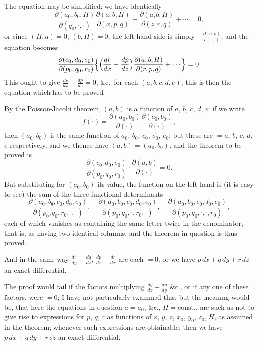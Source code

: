 \documentclass[11pt,a4paper]{article}
\theoremstyle{plain}
\theoremstyle{definition}
\begin{document}
The equation may be simplified; we have identically
\[
\frac{\partial(a_0, b_0, H)}{\partial(q_0, \cdot, \cdot)} \frac{\partial(a, b, H)}{\partial(x, p, q)} + \frac{\partial(a, b, H)}{\partial(z, r, q)} + \cdots = 0,
\]
or since $(H, a) = 0$, $(b, H) = 0$, the left-hand side is simply $-\frac{\partial(a, b)}{\partial(\cdot, \cdot)}$, and the equation becomes
\[
\frac{\partial(c_0, d_0, e_0)}{\partial(p_0, q_0, r_0)} \Bigl\{\Bigl(\frac{dr}{dx} - \frac{dp}{dz}\Bigr) \frac{\partial(a, b, H)}{\partial(r, p, q)} + \cdots\Bigr\} = 0.
\]
This ought to give $\frac{dr}{dx} - \frac{dp}{dz} = 0$, \&c.~for each $(a, b, c, d, e)$; this is then the equation which has to be proved.

By the Poisson-Jacobi theorem, $(a, b)$ is a function of $a$, $b$, $c$, $d$, $e$: if we write
\[
f(\cdot) = \frac{\partial(a_0, b_0)}{\partial(\cdot)} \frac{\partial(a_0, b_0)}{\partial(\cdot)},
\]
then $(a_0, b_0)$ is the same function of $a_0$, $b_0$, $c_0$, $d_0$, $e_0$; but these are $= a$, $b$, $c$, $d$, $e$ respectively, and we thence have $(a, b) = (a_0, b_0)$, and the theorem to be proved is
\[
\frac{\partial(c_0, d_0, e_0)}{\partial(p_0, q_0, r_0)} \cdot \frac{\partial(a, b)}{\partial(\cdot)} = 0.
\]
But substituting for $(a_0, b_0)$ its value, the function on the left-hand is (it is easy to see) the sum of the three functional determinants
\[
\frac{\partial(a_0, b_0, c_0, d_0, e_0)}{\partial(p_0, q_0, r_0, \cdot, \cdot)}, \quad
\frac{\partial(a_0, b_0, c_0, d_0, e_0)}{\partial(p_0, q_0, \cdot, r_0, \cdot)}, \quad
\frac{\partial(a_0, b_0, c_0, d_0, e_0)}{\partial(p_0, q_0, \cdot, \cdot, r_0)},
\]
each of which vanishes as containing the same letter twice in the denominator, that is, as having two identical columns; and the theorem in question is thus proved.

And in the same way $\frac{dr}{dy} - \frac{dq}{dz}$, $\frac{dp}{dz} - \frac{dr}{dx}$ are each $= 0$: or we have $p\,dx + q\,dy + r\,dz$ an exact differential.

The proof would fail if the factors multiplying $\frac{dq}{dx} - \frac{dp}{dy}$ \&c., or if any one of these factors, were $= 0$; I have not particularly examined this, but the meaning would be, that here the equations in question $a = a_0$, \&c., $H = \text{const.}$, are such as not to give rise to expressions for $p$, $q$, $r$ as functions of $x$, $y$, $z$, $x_0$, $y_0$, $z_0$, $H$, as assumed in the theorem; whenever such expressions are obtainable, then we have $p\,dx + q\,dy + r\,dz$ an exact differential.
\end{document}
